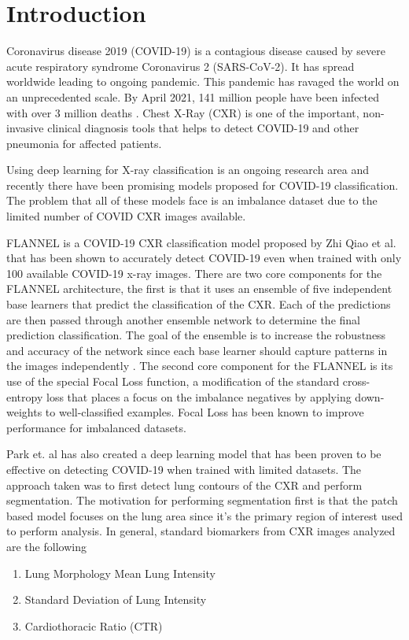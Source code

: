 \documentclass{sigkddExp}
\begin{document}
\section{Introduction}
Coronavirus disease 2019 (COVID-19) is a contagious disease caused by severe
acute respiratory syndrome Coronavirus 2 (SARS-CoV-2). It has spread worldwide
leading to ongoing pandemic. This pandemic has ravaged the world on an
unprecedented scale. By April 2021, 141 million people have been infected with
over 3 million deaths \cite{whocovid1920-apr-21}. Chest X-Ray (CXR) is one of
the important, non-invasive clinical diagnosis tools that helps to detect
COVID-19 and other pneumonia for affected patients.

Using deep learning for X-ray classification is an ongoing research area and
recently there have been promising models proposed for COVID-19 classification.
The problem that all of these models face is an imbalance dataset due to the
limited number of COVID CXR images available.

FLANNEL is a COVID-19 CXR classification model proposed by Zhi Qiao et al.
\cite{10.1093/jamia/ocaa280} that has been shown to accurately detect COVID-19
even when trained with only 100 available COVID-19 x-ray images. There are two
core components for the FLANNEL architecture, the first is that it uses an
ensemble \cite{58871} of five independent base learners that predict the
classification of the CXR. Each of the predictions are then passed through
another ensemble network to determine the final prediction classification. The
goal of the ensemble is to increase the robustness and accuracy of the network
since each base learner should capture patterns in the images independently
\cite{combine}. The second core component for the FLANNEL is its use of the
special Focal Loss \cite{lin2018focal} function, a modification of the standard
cross-entropy loss that places a focus on the imbalance negatives by applying
down-weights to well-classified examples. Focal Loss has been known to improve
performance for imbalanced datasets.

Park et. al \cite{pmid32396075} has also created a deep learning model that has
been proven to be effective on detecting COVID-19 when trained with limited
datasets. The approach taken was to first detect lung contours of the CXR and
perform segmentation. The motivation for performing segmentation first is that
the patch based model focuses on the lung area since it’s the primary region of
interest used to perform analysis.  In general, standard biomarkers
\cite{pmid32396075} from CXR images analyzed are the following
\begin{enumerate}
    \item Lung Morphology Mean Lung Intensity
    \item Standard Deviation of Lung Intensity
    \item Cardiothoracic Ratio (CTR)
\end{enumerate}
\end{document}
